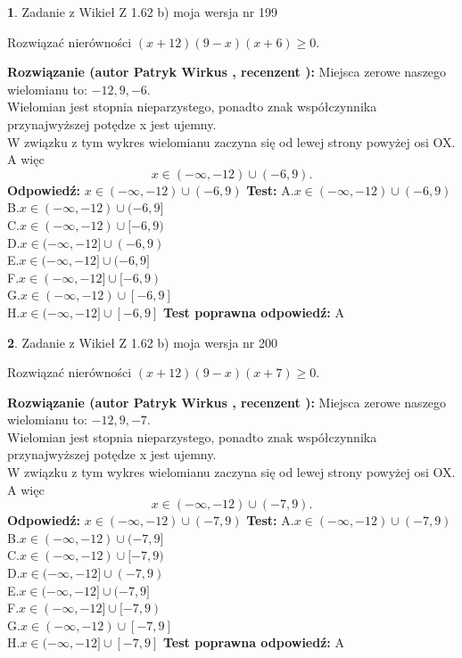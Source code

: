 \documentclass[12pt, a4paper]{article}
\theoremstyle{definition} %
\newtheorem{zad}{}
\newcommand{\zadStart}[1]{\begin{zad}#1\newline}
\newcommand{\zadStop}{\end{zad}}
\newcommand{\rozwStart}[2]{\noindent \textbf{Rozwiązanie (autor #1 , recenzent #2): }\newline}
\newcommand{\rozwStop}{\newline}
\newcommand{\odpStart}{\noindent \textbf{Odpowiedź:}\newline}
\newcommand{\odpStop}{\newline}
\newcommand{\testStart}{\noindent \textbf{Test:}\newline}
\newcommand{\testStop}{\newline}
\newcommand{\kluczStart}{\noindent \textbf{Test poprawna odpowiedź:}\newline}
\newcommand{\kluczStop}{\newline}
\begin{document}
\zadStart{Zadanie z Wikieł Z 1.62 b) moja wersja nr 199}

Rozwiązać nierówności $(x+12)(9-x)(x+6)\ge0$.
\zadStop
\rozwStart{Patryk Wirkus}{}
Miejsca zerowe naszego wielomianu to: $-12, 9, -6$.\\
Wielomian jest stopnia nieparzystego, ponadto znak współczynnika przy\linebreak najwyższej potędze x jest ujemny.\\ W związku z tym wykres wielomianu zaczyna się od lewej strony powyżej osi OX. A więc $$x \in (-\infty,-12) \cup (-6,9).$$
\rozwStop
\odpStart
$x \in (-\infty,-12) \cup (-6,9)$
\odpStop
\testStart
A.$x \in (-\infty,-12) \cup (-6,9)$\\
B.$x \in (-\infty,-12) \cup (-6,9]$\\
C.$x \in (-\infty,-12) \cup [-6,9)$\\
D.$x \in (-\infty,-12] \cup (-6,9)$\\
E.$x \in (-\infty,-12] \cup (-6,9]$\\
F.$x \in (-\infty,-12] \cup [-6,9)$\\
G.$x \in (-\infty,-12) \cup [-6,9]$\\
H.$x \in (-\infty,-12] \cup [-6,9]$
\testStop
\kluczStart
A
\kluczStop



\zadStart{Zadanie z Wikieł Z 1.62 b) moja wersja nr 200}

Rozwiązać nierówności $(x+12)(9-x)(x+7)\ge0$.
\zadStop
\rozwStart{Patryk Wirkus}{}
Miejsca zerowe naszego wielomianu to: $-12, 9, -7$.\\
Wielomian jest stopnia nieparzystego, ponadto znak współczynnika przy\linebreak najwyższej potędze x jest ujemny.\\ W związku z tym wykres wielomianu zaczyna się od lewej strony powyżej osi OX. A więc $$x \in (-\infty,-12) \cup (-7,9).$$
\rozwStop
\odpStart
$x \in (-\infty,-12) \cup (-7,9)$
\odpStop
\testStart
A.$x \in (-\infty,-12) \cup (-7,9)$\\
B.$x \in (-\infty,-12) \cup (-7,9]$\\
C.$x \in (-\infty,-12) \cup [-7,9)$\\
D.$x \in (-\infty,-12] \cup (-7,9)$\\
E.$x \in (-\infty,-12] \cup (-7,9]$\\
F.$x \in (-\infty,-12] \cup [-7,9)$\\
G.$x \in (-\infty,-12) \cup [-7,9]$\\
H.$x \in (-\infty,-12] \cup [-7,9]$
\testStop
\kluczStart
A
\kluczStop
\end{document}
